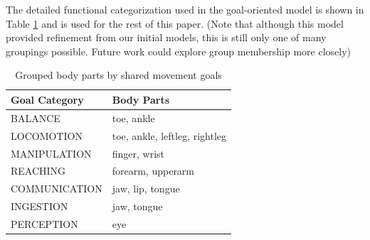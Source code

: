 \documentclass{article}
\begin{document}
The detailed functional categorization used in the goal-oriented model is shown in Table \ref{tab:grouped_goal} and is used for the rest of this paper. (Note that although this model provided refinement from our initial models, this is still only one of many groupings possible. Future work could explore group membership more closely) 

\begin{table}[h]
\centering
\begin{tabular}{|l|l|}
\hline
\textbf{Goal Category} & \textbf{Body Parts} \\
\hline
BALANCE & toe, ankle \\
LOCOMOTION & toe, ankle, leftleg, rightleg \\
MANIPULATION & finger, wrist \\
REACHING & forearm, upperarm \\
COMMUNICATION & jaw, lip, tongue \\
INGESTION & jaw, tongue \\
PERCEPTION & eye \\
\hline
\end{tabular}
\caption{Grouped body parts by shared movement goals}
\label{tab:grouped_goal}
\end{table}
\end{document}
